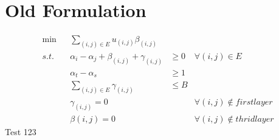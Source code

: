 \documentclass{article}
\begin{document}
\section*{Old Formulation}

\begin{align*}
    \min &  & \sum_{(i,j) \in E} u_{(i,j)}\beta_{(i,j)}            &        &                                  \\
    s.t. &  & \alpha_i - \alpha_j + \beta_{(i,j)} + \gamma_{(i,j)} & \geq 0 & \forall (i,j) \in E              \\
         &  & \alpha_t - \alpha_s                                  & \geq 1 &                                  \\
         &  & \sum_{(i,j) \in E} \gamma_{(i,j)}                    & \leq B &                                  \\
         &  & \gamma_{(i,j)} = 0                                   &        & \forall (i,j) \notin first layer \\
         &  & \beta{(i,j)} = 0                                     &        & \forall (i,j) \notin thrid layer
\end{align*}
Test 123
\end{document}
